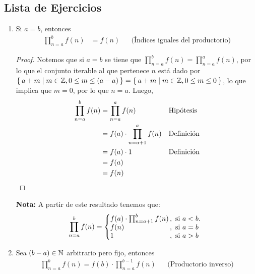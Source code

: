 \subsection*{Lista de Ejercicios}

\begin{enumerate}[label=\alph*)]
  \item Si $a=b$, entonces
  \begin{align*}
    \prod_{n=a}^{b} f(n) &= f(n) && \text{(Índices iguales del productorio)}
  \end{align*}
  
  \begin{proof}\leavevmode
    Notemos que si $a=b$ se tiene que $\prod_{n=a}^{b} f(n) = \prod_{n=a}^{a} f(n)$, por lo que el conjunto iterable al que pertenece $n$ está dado por $\Set{a+m|m\in \mathbb{Z}, 0\leq m\leq (a-a)}=\Set{a+m|m\in \mathbb{Z}, 0\leq m\leq 0}$, lo que implica que $m=0$, por lo que $n=a$. Luego,
    \begin{align*}
      \prod_{n=a}^{b} f(n) &= \prod_{n=a}^{a} f(n) && \text{Hipótesis}\\
      &= f(a) \cdot \prod_{n=a+1}^{a} f(n) && \text{Definición}\\
      &= f(a) \cdot 1 && \text{Definición}\\
      &= f(a)\\
      &= f(n) && \qedhere
    \end{align*}
  \end{proof}

  \textbf{Nota:} A partir de este resultado tenemos que:
  \[
    \prod_{n=a}^{b} f(n) = \left\{
    \begin{array}{@{}l@{\thinspace}l}
    f(a) \cdot \prod_{n=a+1}^{b} f(n) &,  \ \text{si}  \ a<b.\\
    f(n) &,  \ \text{si}  \ a=b\\
    1 &,  \ \text{si}  \ a>b
    \end{array} \right. \]
    
    \item Sea $(b-a)\in \mathbb{N}$ arbitrario pero fijo, entonces
    \begin{align*}
      \prod_{n=a}^{b} f(n) = f(b) \cdot \prod_{n=a}^{b-1} f(n) && \text{(Productorio inverso)}
    \end{align*}


\end{enumerate}
